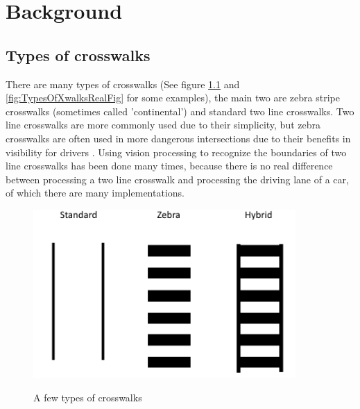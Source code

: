 \documentclass[12pt]{ucthesis}
\newcommand{\captionfonts}{\small\bf\ssp}
\begin{document}

\chapter{Background}
\section{Types of crosswalks}


There are many types of crosswalks (See figure \ref{fig:TypesOfXwalksFig} and \ref{fig:TypesOfXwalksRealFig} for some examples), the main two are zebra stripe crosswalks (sometimes called 'continental') and standard two line crosswalks. Two line crosswalks are more commonly used due to their simplicity, but zebra crosswalks are often used in more dangerous intersections due to their benefits in visibility for drivers \cite{crosswalkTypeEvaluation}. Using vision processing to recognize the boundaries of two line crosswalks has been done many times, because there is no real difference between processing a two line crosswalk and processing the driving lane of a car, of which there are many implementations.

\begin{figure}[h!]
\begin{center}
\includegraphics[width=10cm]{TypesOfXwalks.png}
\captionfonts
\caption[Three Types of Crosswalks]{A few types of crosswalks}
\label{fig:TypesOfXwalksFig}
\end{center}
\end{figure}
\end{document}
